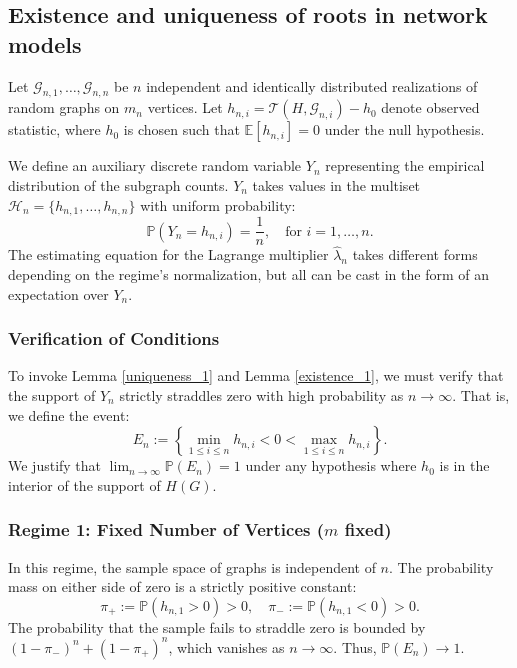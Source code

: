 \documentclass[12pt]{article}
\numberwithin{equation}{section}
\begin{document}
\subsection{Existence and uniqueness of roots in network models}

Let $\mathcal{G}_{n,1}, \dots, \mathcal{G}_{n,n}$ be $n$ independent and identically distributed realizations of random graphs on $m_n$ vertices. Let $h_{n,i} = \mathcal{T}(H, \mathcal{G}_{n,i}) - h_0$ denote observed statistic, where $h_0$ is chosen such that $\mathbb{E}[h_{n,i}] = 0$ under the null hypothesis.

We define an auxiliary discrete random variable $Y_n$ representing the empirical distribution of the subgraph counts. $Y_n$ takes values in the multiset $\mathcal{H}_n = \{h_{n,1}, \dots, h_{n,n}\}$ with uniform probability:
\[
\mathbb{P}(Y_n = h_{n,i}) = \frac{1}{n}, \quad \text{for } i=1,\dots,n.
\]
The estimating equation for the Lagrange multiplier $\hat{\lambda}_n$ takes different forms depending on the regime's normalization, but all can be cast in the form of an expectation over $Y_n$.

\subsubsection{Verification of Conditions}

To invoke Lemma \ref{uniqueness_1} and Lemma \ref{existence_1}, we must verify that the support of $Y_n$ strictly straddles zero with high probability as $n \to \infty$. That is, we define the event:
\[
E_n := \left\{ \min_{1 \le i \le n} h_{n,i} < 0 < \max_{1 \le i \le n} h_{n,i} \right\}.
\]
We justify that $\lim_{n \to \infty} \mathbb{P}(E_n) = 1$ under any hypothesis where $h_0$ is in the interior of the support of $H(G)$.

\subsubsection*{Regime 1: Fixed Number of Vertices ($m$ fixed)}
In this regime, the sample space of graphs is independent of $n$. The probability mass on either side of zero is a strictly positive constant:
\[
\pi_+ := \mathbb{P}(h_{n,1} > 0) > 0, \quad \pi_- := \mathbb{P}(h_{n,1} < 0) > 0.
\]
The probability that the sample fails to straddle zero is bounded by $(1-\pi_-)^n + (1-\pi_+)^n$, which vanishes as $n \to \infty$. Thus, $\mathbb{P}(E_n) \to 1$.
\end{document}
